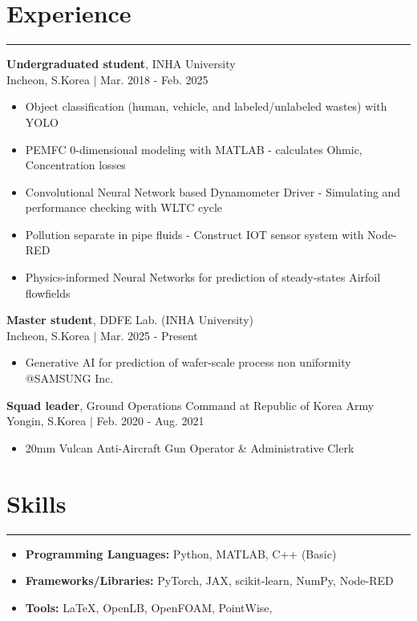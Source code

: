 \documentclass{article} %
\newcommand{\mycventry}[5]{
  \vspace{1.5em} %

  \textbf{#1}, #2 \\ %
  #3 $|$ #4 \\[0.4em] %

  \begin{itemize}[nosep, after=\vspace{-0.4em}] %
    #5 %
  \end{itemize}
}
\newcommand{\sectionsplitrule}{
  \hrule %
  \vspace{1em} %
}
\begin{document}
\section*{Experience}
\sectionsplitrule

\mycventry
  {Undergraduated student} %
  {INHA University} %
  {Incheon, S.Korea} %
  {Mar. 2018 - Feb. 2025} %
  { %
    \item Object classification (human, vehicle, and labeled/unlabeled wastes) with YOLO
	\item PEMFC 0-dimensional modeling with MATLAB - calculates Ohmic, Concentration losses
	\item Convolutional Neural Network based Dynamometer Driver - Simulating and performance checking with WLTC cycle
	\item Pollution separate in pipe fluids - Construct IOT sensor system with Node-RED
    \item Physics-informed Neural Networks for prediction of steady-states Airfoil flowfields
  }

\mycventry
  {Master student} %
  {DDFE Lab. (INHA University)} %
  {Incheon, S.Korea} %
  {Mar. 2025 - Present} %
  { %
    \item Generative AI for prediction of wafer-scale process non uniformity @SAMSUNG Inc.
  }


\mycventry
  {Squad leader} %
  {Ground Operations Command at Republic of Korea Army} %
  {Yongin, S.Korea} %
  {Feb. 2020 - Aug. 2021} %
  {
    \item 20mm Vulcan Anti-Aircraft Gun Operator \& Administrative Clerk
  }

\section*{Skills}
\sectionsplitrule

\begin{itemize}[leftmargin=1.5em, parsep=0.5em] %
    \item \textbf{Programming Languages:} Python, MATLAB, C++ (Basic)
    \item \textbf{Frameworks/Libraries:} PyTorch, JAX, scikit-learn, NumPy, Node-RED
    \item \textbf{Tools:} LaTeX, OpenLB, OpenFOAM, PointWise, 
\end{itemize}
\end{document}

